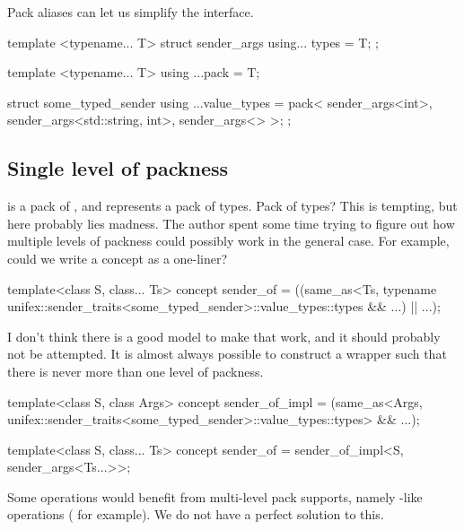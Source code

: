 \documentclass{wg21}
\begin{document}
Pack aliases can let us simplify the interface.

\begin{colorblock}
    template <typename... T>
    struct sender_args {
        using... types = T;
    };

    template <typename... T>
    using ...pack = T;

    struct some_typed_sender {
        using ...value_types = pack<
            sender_args<int>,
            sender_args<std::string, int>,
            sender_args<>
        >;
    };
\end{colorblock}

\subsection{Single level of packness}
\label{sec:packnesslevel}

 is a pack of , and  represents a
pack of types. Pack of types?
This is tempting, but here probably lies madness.
The author spent some time trying to figure out how multiple levels of packness could possibly work in the general case. For example, could we
write a  concept as a one-liner?

\begin{colorblock}
    template<class S, class... Ts>
    concept sender_of = ((same_as<Ts,
    typename unifex::sender_traits<some_typed_sender>::value_types::types && ...) || ...);
\end{colorblock}

I don't think there is a good model to make that work, and it should probably not be attempted.
It is almost always possible to construct a wrapper such that there is never more than one level of packness.

\begin{colorblock}
    template<class S, class Args>
    concept sender_of_impl =
    (same_as<Args, unifex::sender_traits<some_typed_sender>::value_types::types> && ...);

    template<class S, class... Ts>
    concept sender_of = sender_of_impl<S, sender_args<Ts...>>;
\end{colorblock}


Some operations would benefit from multi-level pack supports, namely -like operations ( for example).
We do not have a perfect solution to this.
\end{document}
